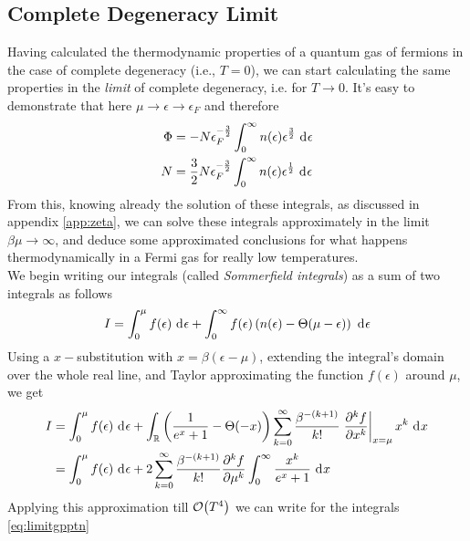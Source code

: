 \documentclass[../qm.tex]{subfiles}
\begin{document}
	\subsection{Complete Degeneracy Limit}
	Having calculated the thermodynamic properties of a quantum gas of fermions in the case of complete degeneracy (i.e., $T=0$), we can start calculating the same properties in the \textit{limit} of complete degeneracy, i.e. for $T\to0$. It's easy to demonstrate that here $\mu\to\epsilon\to\epsilon_F$ and therefore
	\begin{equation}
		\begin{aligned}
			\Phi&=-N\epsilon_F^{-\frac{3}{2}}\int_{0}^{\infty}n(\epsilon)\epsilon^{\frac{3}{2}}\ \mathrm{d}^{}\epsilon\\
			N&=\frac{3}{2}N\epsilon_F^{-\frac{3}{2}}\int_{0}^{\infty}n(\epsilon)\epsilon^{\frac{1}{2}}\ \mathrm{d}^{}\epsilon
		\end{aligned}
		\label{eq:limitgpptn}
	\end{equation}
	From this, knowing already the solution of these integrals, as discussed in appendix \eqref{app:zeta}, we can solve these integrals approximately in the limit $\beta\mu\to\infty$, and deduce some approximated conclusions for what happens thermodynamically in a Fermi gas for really low temperatures.\\
	We begin writing our integrals (called \textit{Sommerfield integrals}) as a sum of two integrals as follows
	\begin{equation}
		I=\int_{0}^{\mu}f(\epsilon)\ \mathrm{d}^{}\epsilon+\int_{0}^{\infty}f(\epsilon)\left( n(\epsilon)-\Theta(\mu-\epsilon) \right)\ \mathrm{d}^{}\epsilon
		\label{eq:Sommerfieldint1}
	\end{equation}
	Using a $x-$substitution with $x=\beta(\epsilon-\mu)$, extending the integral's domain over the whole real line, and Taylor approximating the function $f(\epsilon)$ around $\mu$, we get
	\begin{equation}
		\begin{aligned}
			I&=\int_{0}^{\mu}f(\epsilon)\ \mathrm{d}^{}\epsilon+\int_{\mathbb{R}}^{}\left( \frac{1}{e^x+1}-\Theta(-x) \right)\sum_{k=0}^{\infty}\frac{\beta^{-(k+1)}}{k!}\left.\pdv[k]{f}{x}\right|_{x=\mu}x^k\ \mathrm{d}^{}x\\
				&=\int_{0}^{\mu}f(\epsilon)\ \mathrm{d}^{}\epsilon+2\sum_{k=0}^{\infty}\frac{\beta^{-(k+1)}}{k!}\pdv[k]{f}{\mu}\int_{0}^{\infty}\frac{x^k}{e^{x}+1}\ \mathrm{d}^{}x
		\end{aligned}
		\label{eq:sommapprox}
	\end{equation}
	Applying this approximation till $\order{T^4}$ we can write for the integrals \eqref{eq:limitgpptn}
\end{document}
